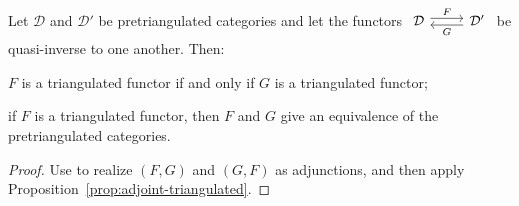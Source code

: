 \begin{corollary}\label{prop:triangulated-equivalence}
	Let $\mathcal{D}$ and $\mathcal{D}'$ be pretriangulated categories and
	let the functors
	$\begin{tikzcd}
		\mathcal{D} \arrow[shift left, r, "F"] & \mathcal{D}' \arrow[shift left, l, "G"]
	\end{tikzcd}$
	be quasi-inverse to one another. Then:
	\begin{compactenum}[(i)]
		\item $F$ is a triangulated functor if and only if $G$ is a
		triangulated functor;
		\item if $F$ is a triangulated functor, then $F$ and $G$ give an
		equivalence of the pretriangulated categories.
	\end{compactenum}
\end{corollary}

\begin{proof}
	Use \cite[Theorem~2.6.12]{Li1} to realize $(F, G)$ and $(G, F)$ as
	adjunctions, and then apply Proposition~\ref{prop:adjoint-triangulated}.
\end{proof}

